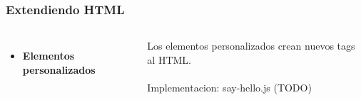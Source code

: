 \documentclass{beamer}
\begin{document}
\begin{frame}
\frametitle{Extendiendo HTML}
\begin{columns}[c]
\begin{itemize}
\item \textbf{Elementos personalizados}
\end{itemize}

Los elementos personalizados crean nuevos tags al HTML.
\\~\\
Implementacion: say-hello.js (TODO)
\end{columns}
\end{frame}

\end{document}
